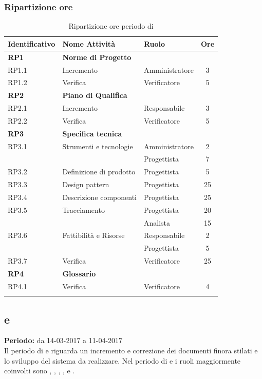 \subsubsection{Ripartizione ore}
\bgroup
\begin{longtable}{|l|l|l|c|}
	\endfirsthead
	\hline
	\textbf{Identificativo} &
	\textbf{Nome Attività} &
	\textbf{Ruolo} &
	\textbf{Ore}\\
	\endhead
	\hline
	\textbf{RP1} & \textbf{Norme di Progetto} &  &  \\
	\hline
	{RP1.1} & {Incremento} & Amministratore  & 3\\
	\hline
	{RP1.2} & {Verifica} & Verificatore & 5 \\
	\hline
	\textbf{RP2} & \textbf{Piano di Qualifica}  & & \\
	\hline
	{RP2.1} & {Incremento} & Responsabile &  3\\
	\hline
	{RP2.2} & {Verifica} & Verificatore & 5 \\
	\hline
	\textbf{RP3} & \textbf{Specifica tecnica} & &  \\
	\hline
	{RP3.1} & {Strumenti e tecnologie} & Amministratore  &  2\\
	& & Progettista & 7 \\
	\hline
	{RP3.2} & {Definizione di prodotto} & Progettista  &  5\\
	\hline
	{RP3.3} & {Design pattern} & Progettista  &  25\\
	\hline
	{RP3.4} & {Descrizione componenti} & Progettista  &  25\\
	\hline
	{RP3.5} & {Tracciamento} & Progettista  &  20\\
	& & Analista & 15 \\
	\hline
	{RP3.6} & {Fattibilità e Risorse} & Responsabile  &  2\\
	& & Progettista & 5 \\
	\hline
	{RP3.7} & {Verifica} & Verificatore  &  25\\
	\hline
	\textbf{RP4} & \textbf{Glossario} & &  \\
	\hline
	{RP4.1} & {Verifica} & Verificatore &  4 \\
	\hline

	\caption{Ripartizione ore periodo di \PA{}}
\end{longtable}
\egroup

\subsection{\PD{} e \Cod{}}
\textbf{Periodo:} da 14-03-2017 a 11-04-2017 \\
Il periodo di \PD{} e \Cod{} riguarda un incremento e correzione dei documenti finora stilati e lo sviluppo del sistema da realizzare.
Nel periodo di \PD{} e \Cod{} i ruoli maggiormente coinvolti sono \Programmatore{}, \Progettista{}, \Analista{}, \Responsabile{}, \Amministratore{} e \Verificatore{}.
